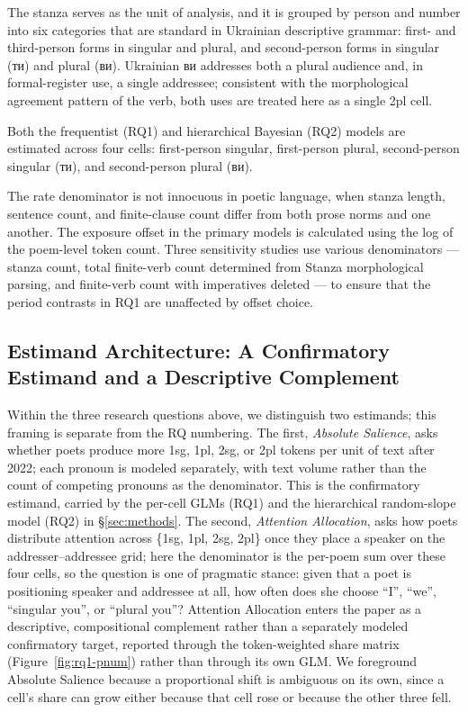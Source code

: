 \documentclass[12pt]{interact}
\theoremstyle{plain}%
\theoremstyle{definition}
\theoremstyle{remark}
\begin{document}
The stanza serves as the unit of analysis, and it is grouped by person and number into six categories that are standard in Ukrainian descriptive grammar: first- and third-person forms in singular and plural, and second-person forms in singular ({\ukrainianfont ти}) and plural ({\ukrainianfont ви}). Ukrainian {\ukrainianfont ви} addresses both a plural audience and, in formal-register use, a single addressee; consistent with the morphological agreement pattern of the verb, both uses are treated here as a single 2pl cell.

Both the frequentist (RQ1) and hierarchical Bayesian (RQ2) models are estimated across four cells: first-person singular, first-person plural, second-person singular ({\ukrainianfont ти}), and second-person plural ({\ukrainianfont ви}).

The rate denominator is not innocuous in poetic language, when stanza length, sentence count, and finite-clause count differ from both prose norms and one another. The exposure offset in the primary models is calculated using the log of the poem-level token count. Three sensitivity studies use various denominators — stanza count, total finite-verb count determined from Stanza morphological parsing, and finite-verb count with imperatives deleted — to ensure that the period contrasts in RQ1 are unaffected by offset choice.

\subsection{Estimand Architecture: A Confirmatory Estimand and a Descriptive Complement}

Within the three research questions above, we distinguish two estimands; this framing is separate from the RQ numbering. The first, \emph{Absolute Salience}, asks whether poets produce more 1sg, 1pl, 2sg, or 2pl tokens per unit of text after 2022; each pronoun is modeled separately, with text volume rather than the count of competing pronouns as the denominator. This is the confirmatory estimand, carried by the per-cell GLMs (RQ1) and the hierarchical random-slope model (RQ2) in \S\ref{sec:methods}. The second, \emph{Attention Allocation}, asks how poets distribute attention across \{1sg, 1pl, 2sg, 2pl\} once they place a speaker on the addresser--addressee grid; here the denominator is the per-poem sum over these four cells, so the question is one of pragmatic stance: given that a poet is positioning speaker and addressee at all, how often does she choose ``I'', ``we'', ``singular you'', or ``plural you''? Attention Allocation enters the paper as a descriptive, compositional complement rather than a separately modeled confirmatory target, reported through the token-weighted share matrix (Figure~\ref{fig:rq1-pnum}) rather than through its own GLM. We foreground Absolute Salience because a proportional shift is ambiguous on its own, since a cell's share can grow either because that cell rose or because the other three fell.
\end{document}
